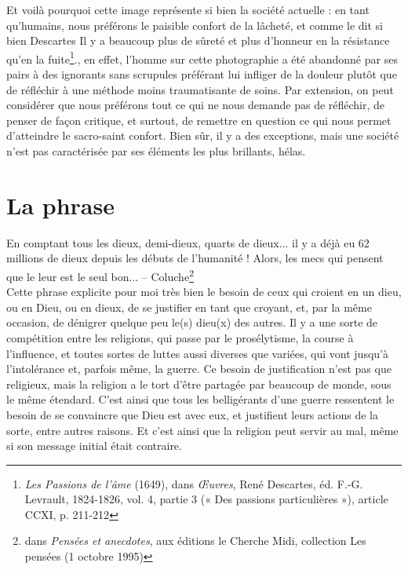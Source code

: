 \documentclass[12pt,a4paper]{article}
\begin{document}
{Et voilà pourquoi cette image représente si bien la société actuelle : en tant qu'humains, nous préférons le paisible confort de la lâcheté, et comme le dit si bien Descartes \og{}Il y a beaucoup plus de sûreté et plus d'honneur en la résistance qu'en la fuite\footnote{\emph{Les Passions de l'âme} (1649), dans \emph{Œuvres}, René Descartes, éd. F.-G. Levrault, 1824-1826, vol. 4, partie 3 (« Des passions particulières »), article CCXI, p. 211-212}.\fg{}, en effet, l'homme sur cette photographie a été abandonné par ses pairs à des ignorants sans scrupules préférant lui infliger de la douleur plutôt que de réfléchir à une méthode moins traumatisante de soins. Par extension, on peut considérer que nous préférons tout ce qui ne nous demande pas de réfléchir, de penser de façon critique, et surtout, de remettre en question ce qui nous permet d'atteindre le sacro-saint confort. Bien sûr, il y a des exceptions, mais une société n'est pas caractérisée par ses éléments les plus brillants, hélas.\\

\part{La phrase}

\og{}En comptant tous les dieux, demi-dieux, quarts de dieux... il y a déjà eu 62 millions de dieux depuis les débuts de l'humanité ! Alors, les mecs qui pensent que le leur est le seul bon...\fg{} -- Coluche\footnote{dans \emph{Pensées et anecdotes}, aux éditions le Cherche Midi, collection \og{}Les pensées\fg{} (1 octobre 1995)}\\

Cette phrase explicite pour moi très bien le besoin de ceux qui croient en un dieu, ou en Dieu, ou en dieux, de se justifier en tant que croyant, et, par la même occasion, de dénigrer quelque peu le(s) dieu(x) des autres. Il y a une sorte de compétition entre les religions, qui passe par le prosélytisme, la course à l'influence, et toutes sortes de luttes aussi diverses que variées, qui vont jusqu'à l'intolérance et, parfois même, la guerre. Ce besoin de justification n'est pas que religieux, mais la religion a le tort d'être partagée par beaucoup de monde, sous le même \og{}étendard\fg{}. C'est ainsi que tous les belligérants d'une guerre ressentent le besoin de se convaincre que Dieu est avec eux, et justifient leurs actions de la sorte, entre autres raisons. Et c'est ainsi que la religion peut servir au mal, même si son message initial était contraire.\\

}
\end{document}
